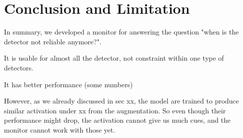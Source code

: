 \section{Conclusion and Limitation}

In summary, we developed a monitor for answering the question "when is the detector not reliable anymore?". 

It is usable for almost all the detector, not constraint within one type of detectors.  

It has better performance (some numbers)

However, as we already discussed in sec xx, the model are trained to produce similar activation under xx from the augmentation. So even though their performance might drop, the activation cannot give us much cues, and the monitor cannot work with those yet.

\label{sec:Conclusion}